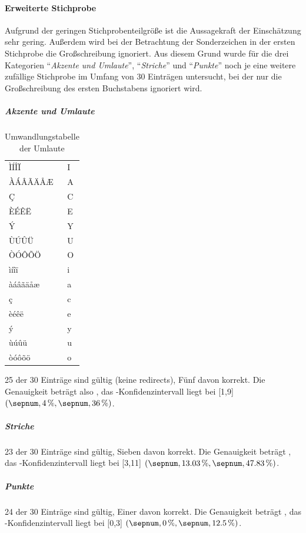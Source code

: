 \paragraph{Erweiterte Stichprobe}
Aufgrund der geringen Stichprobenteilgröße ist die Aussagekraft der Einschätzung sehr gering. Außerdem wird bei der Betrachtung der Sonderzeichen in der ersten Stichprobe die Großschreibung ignoriert.
Aus diesem Grund wurde für die drei Kategorien "`\emph{Akzente und Umlaute}"', "`\emph{Striche}"' und "`\emph{Punkte}"' noch je eine weitere zufällige Stichprobe im Umfang von 30 Einträgen untersucht,
bei der nur die Großschreibung des ersten Buchstabens ignoriert wird.
\subparagraph{Akzente und Umlaute}
\begin{table}[h]
\caption{Umwandlungstabelle der Umlaute}
\begin{tabular}{l|l}
\toprule
ÌÍÎÏ		&I\\
ÀÁÂÃÄÅÆ		&A\\
Ç		&C\\
ÈÉÊË		&E\\
Ý		&Y\\
ÙÚÛÜ		&U\\
ÒÓÔÕÖ		&O\\
ìíîï		&i\\
àáâãäåæ		&a\\
ç		&c\\
èéêë		&e\\
ý		&y\\
ùúûü		&u\\
òóôõö		&o\\
\bottomrule
\end{tabular}
\end{table}
25 der 30 Einträge sind gültig (keine redirects), Fünf davon korrekt. Die Genauigkeit beträgt also , das -Konfidenzintervall liegt bei [1,9] $(\valunit{4}{\%},\valunit{36}{\%})$.
\subparagraph{Striche}
23 der 30 Einträge sind gültig, Sieben davon korrekt. Die Genauigkeit beträgt , das -Konfidenzintervall liegt bei [3,11] $(\valunit{13.03}{\%},\valunit{47.83}{\%})$.
\subparagraph{Punkte}
24 der 30 Einträge sind gültig, Einer davon korrekt. Die Genauigkeit beträgt , das -Konfidenzintervall liegt bei [0,3] $(\valunit{0}{\%},\valunit{12.5}{\%})$.
